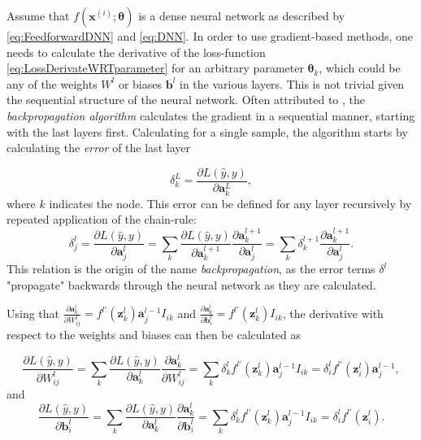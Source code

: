 Assume that $f(\boldsymbol{x}^{(i)}; \boldsymbol{\theta})$ is a dense neural network as described by \cref{eq:FeedforwardDNN} and \cref{eq:DNN}. In order to use gradient-based methods, one needs to calculate the derivative of the loss-function \cref{eq:LossDerivateWRTparameter} for an arbitrary parameter $\boldsymbol{\theta}_k$, which could be any of the weights $W^l$ or biases $\boldsymbol{b}^l$ in the various layers. This is not trivial given the sequential structure of the neural network. Often attributed to \citet{Rumelhart}, the \emph{backpropagation algorithm} calculates the gradient in a sequential manner, starting with the last layers first. Calculating for a single sample, the algorithm starts by calculating the \emph{error} of the last layer


\begin{equation}\label{eq:lastLayerError}
    \delta^L_k = \frac{\partial L(\hat{y}, y)}{\partial \boldsymbol{a}^L_k},
\end{equation}
where $k$ indicates the node. This error can be defined for any layer recursively by repeated application of the chain-rule:
\begin{equation}\label{eq:error}
    \delta^l_j = \frac{\partial L(\hat{y}, y)}{\partial \boldsymbol{a}^l_j} 
    = \sum_k \frac{\partial L(\hat{y}, y)}{\partial \boldsymbol{a}^{l+1}_k} \frac{\partial \boldsymbol{a}^{l+1}_k}{\partial \boldsymbol{a}^{l}_j}
    = \sum_k \delta^{l+1}_k \frac{\partial \boldsymbol{a}^{l+1}_k}{\partial \boldsymbol{a}^{l}_j}.
\end{equation}
This relation is the origin of the name \emph{backpropagation}, as the error terms $\delta^l$ "propagate" backwards through the neural network as they are calculated.

Using that 
$\frac{\partial \boldsymbol{a}^{l}_k}{\partial W^l_{ij}} = f^{l\prime}(\boldsymbol{z}^{l}_k)\boldsymbol{a}^{l-1}_j I_{ik}$ 
and 
$\frac{\partial \boldsymbol{a}^{l}_k}{\partial \boldsymbol{b}^l_{i}} = f^{l\prime}(\boldsymbol{z}^{l}_k) I_{ik}$, the derivative with respect to the weights and biases can then be calculated as 

\begin{equation}\label{eq:derivweights}
    \frac{\partial L(\hat{y}, y)}{\partial W^l_{ij}} = 
    \sum_k \frac{\partial L(\hat{y}, y)}{\partial \boldsymbol{a}^{l}_k} \frac{\partial \boldsymbol{a}^{l}_k}{\partial W^l_{ij}} = 
    \sum_k \delta^{l}_k f^{l\prime}(\boldsymbol{z}^{l}_k)\boldsymbol{a}^{l-1}_j I_{ik}=
    \delta^{l}_i f^{l\prime}(\boldsymbol{z}^l_i) \boldsymbol{a}^{l-1}_j,
\end{equation}
and
\begin{equation}\label{eq:derivbiases}
    \frac{\partial L(\hat{y}, y)}{\partial \boldsymbol{b}^l_{i}} = 
    \sum_k \frac{\partial L(\hat{y}, y)}{\partial \boldsymbol{a}^{l}_k} \frac{\partial \boldsymbol{a}^{l}_k}{\partial \boldsymbol{b}^l_{i}} = 
    \sum_k \delta^{l}_k f^{l\prime}(\boldsymbol{z}^{l}_k)\boldsymbol{a}^{l-1}_j I_{ik}=
    \delta^{l}_i f^{l\prime}(\boldsymbol{z}^l_i).
\end{equation}

